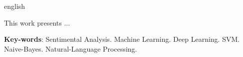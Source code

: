 \begin{resumo}[Abstract]
 \begin{otherlanguage*}{english}
 
 This work presents ...
 
   \vspace{\onelineskip}
 
   \noindent 
   \textbf{Key-words}: Sentimental Analysis. Machine Learning. Deep Learning. SVM. Naive-Bayes. Natural-Language Processing.
 \end{otherlanguage*}
\end{resumo}
\newpage